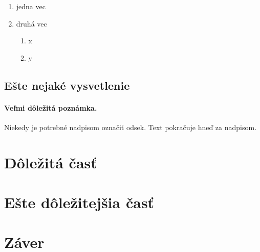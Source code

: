\documentclass[10pt,twoside,slovak,a4paper]{coursepaper}
\begin{document}
\begin{enumerate}
\item jedna vec
\item druhá vec
	\begin{enumerate}
	\item x
	\item y
	\end{enumerate}
\end{enumerate}


\subsection{Ešte nejaké vysvetlenie} \label{ina:este}

\paragraph{Veľmi dôležitá poznámka.}
Niekedy je potrebné nadpisom označiť odsek. Text pokračuje hneď za nadpisom.



\section{Dôležitá časť} \label{dolezita}




\section{Ešte dôležitejšia časť} \label{dolezitejsia}




\section{Záver} \label{zaver} %






\end{document}
